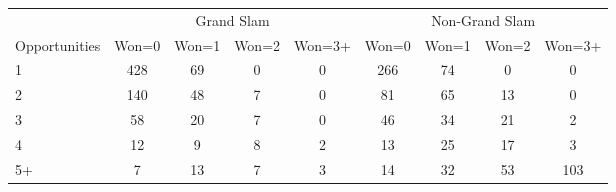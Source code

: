 \begin{tabular}{l cccc cccc}
\toprule
 & \multicolumn{4}{c}{Grand Slam} & \multicolumn{4}{c}{Non-Grand Slam} \\
\cmidrule(lr){2-5} \cmidrule(lr){6-9}
Opportunities & Won=0 & Won=1 & Won=2 & Won=3+ & Won=0 & Won=1 & Won=2 & Won=3+ \\
\midrule
1 & 428 & 69 & 0 & 0 & 266 & 74 & 0 & 0 \\
2 & 140 & 48 & 7 & 0 & 81 & 65 & 13 & 0 \\
3 & 58 & 20 & 7 & 0 & 46 & 34 & 21 & 2 \\
4 & 12 & 9 & 8 & 2 & 13 & 25 & 17 & 3 \\
5+ & 7 & 13 & 7 & 3 & 14 & 32 & 53 & 103 \\
\bottomrule
\end{tabular}
